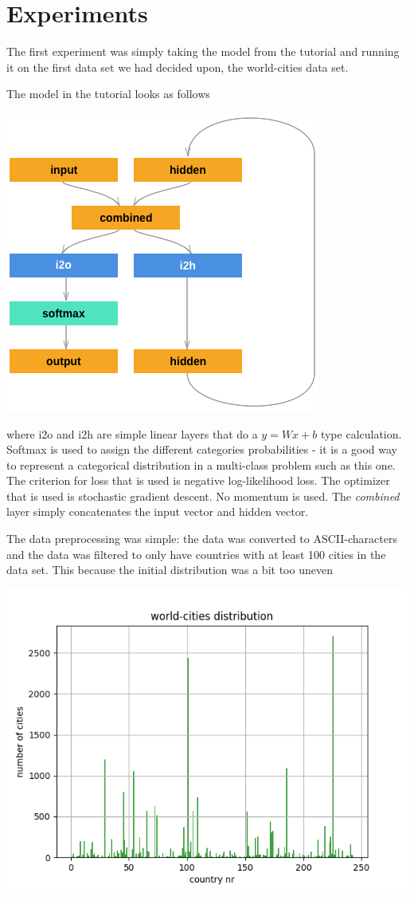 \documentclass[runningheads]{llncs}
\begin{document}
\section{Experiments}

The first experiment was simply taking the model from the tutorial and running it on the first data set we had decided upon, the world-cities data set. 

The model in the tutorial looks as follows
\begin{center}
        \includegraphics[width=.5\textwidth]{../plots/tutorial_model.png}
\end{center}

where i2o and i2h are simple linear layers that do a $y=Wx + b$ type calculation. Softmax is used to assign the different categories probabilities - it is a good way to represent a categorical distribution in a multi-class problem such as this one.
The criterion for loss that is used is negative log-likelihood loss.
The optimizer that is used is stochastic gradient descent. No momentum is used.
The \textit{combined} layer simply concatenates the input vector and hidden vector.

The data preprocessing was simple: the data was converted to ASCII-characters and the data was filtered to only have countries with at least 100 cities in the data set. This because the initial distribution was a bit too uneven

\begin{center}
        \includegraphics[width=.5\textwidth]{../plots/dist.png}
\end{center}
\end{document}
